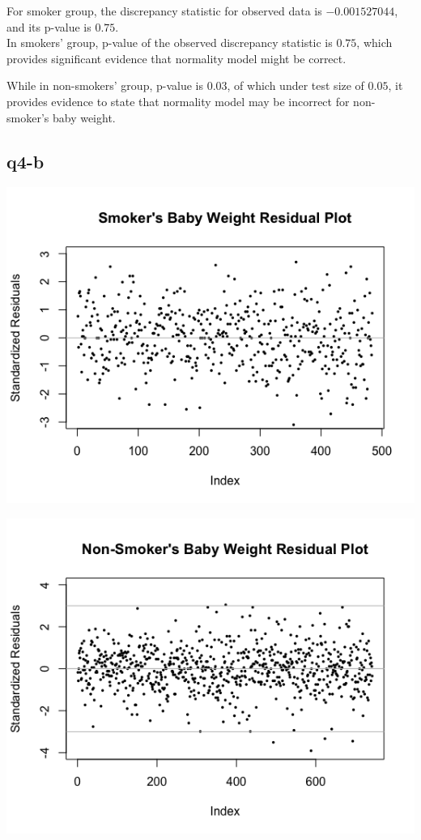 \documentclass[11pt,letterpaper]{article}
\begin{document}
\noindent 	For smoker group, the discrepancy statistic for observed data is $-0.001527044$, and its p-value is $0.75$.\\

\noindent In smokers' group, p-value of the observed discrepancy statistic is $0.75$, which provides significant evidence that normality model might be correct.

\noindent While in non-smokers' group, p-value is $0.03$, of which under test size of $0.05$, it provides evidence to state that normality model may be incorrect for non-smoker's baby weight. 

\subsection*{q4-b}

\includegraphics[scale=0.6]{q4-b-smoke.png}

\includegraphics[scale=0.6]{q4-b-nonsmoke.png}
\end{document}
